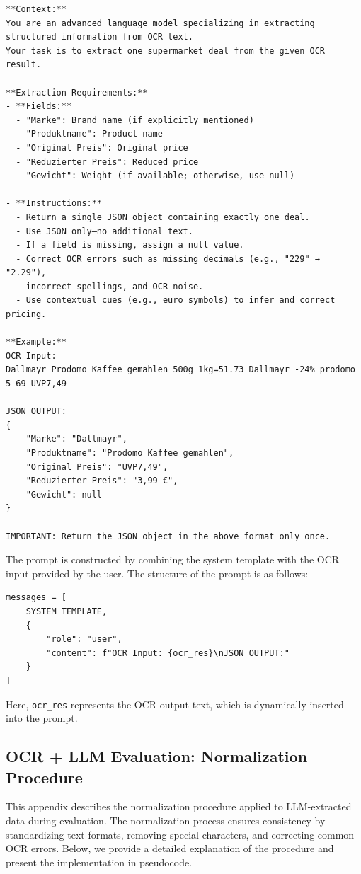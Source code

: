 \documentclass[11pt]{article}
\begin{document}
\begin{verbatim}
**Context:**  
You are an advanced language model specializing in extracting 
structured information from OCR text. 
Your task is to extract one supermarket deal from the given OCR result.

**Extraction Requirements:**  
- **Fields:**  
  - "Marke": Brand name (if explicitly mentioned)  
  - "Produktname": Product name  
  - "Original Preis": Original price  
  - "Reduzierter Preis": Reduced price  
  - "Gewicht": Weight (if available; otherwise, use null)

- **Instructions:**  
  - Return a single JSON object containing exactly one deal.
  - Use JSON only—no additional text.
  - If a field is missing, assign a null value.
  - Correct OCR errors such as missing decimals (e.g., "229" → "2.29"), 
    incorrect spellings, and OCR noise.
  - Use contextual cues (e.g., euro symbols) to infer and correct pricing.

**Example:**  
OCR Input:                     
Dallmayr Prodomo Kaffee gemahlen 500g 1kg=51.73 Dallmayr -24% prodomo 5 69 UVP7,49  

JSON OUTPUT:
{
    "Marke": "Dallmayr",
    "Produktname": "Prodomo Kaffee gemahlen",
    "Original Preis": "UVP7,49",
    "Reduzierter Preis": "3,99 €",
    "Gewicht": null
}

IMPORTANT: Return the JSON object in the above format only once.
\end{verbatim}

The prompt is constructed by combining the system template with the OCR input provided by the user. The structure of the prompt is as follows:

\begin{verbatim}
messages = [
    SYSTEM_TEMPLATE,
    {
        "role": "user",
        "content": f"OCR Input: {ocr_res}\nJSON OUTPUT:"
    }
]
\end{verbatim}

Here, \texttt{ocr\_res} represents the OCR output text, which is dynamically inserted into the prompt.

\subsection{OCR + LLM Evaluation: Normalization Procedure}
\label{app:ocr_llm_normalization}

This appendix describes the normalization procedure applied to LLM-extracted data during evaluation. The normalization process ensures consistency by standardizing text formats, removing special characters, and correcting common OCR errors. Below, we provide a detailed explanation of the procedure and present the implementation in pseudocode.
\end{document}
